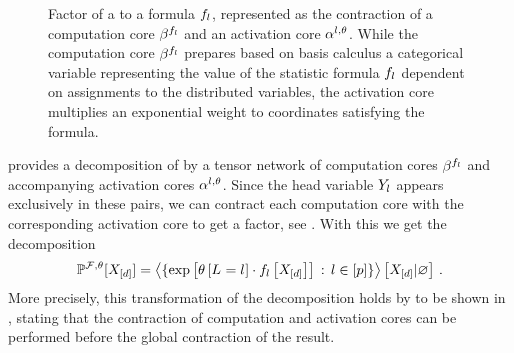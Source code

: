 \begin{figure}[t!]
    \begin{center}
        
    \end{center}
    \caption{Factor of a \MarkovLogicNetwork{} to a formula $f_{l}$, represented as the contraction of a computation core $\beta^{f_{l}}$ and an activation core $\alpha^{l,\theta}$.
    While the computation core $\beta^{f_{l}}$ prepares based on basis calculus a categorical variable representing the value of the statistic formula $f_{l}$ dependent on assignments to the distributed variables, the activation core multiplies an exponential weight to coordinates satisfying the formula.
    }
    \label{fig:mlnFactor}
\end{figure}

 provides a decomposition of \MarkovLogicNetworks{} by a tensor network of computation cores $\beta^{f_{l}}$ and accompanying activation cores $\alpha^{l,\theta}$.
Since the head variable $Y_{l}$ appears exclusively in these pairs, we can contract each computation core with the corresponding activation core to get a factor, see .
With this we get the decomposition
\begin{align*}
    \mathbb{P}^{\mathcal{F},\theta}[X_{[d]}]
    = \left\langle \{\mathrm{exp}\left[\theta\left[L_{}=l_{}\right]\cdot f_{l}\left[X_{[d]}\right]\right] \,:\, l\in[p]\}\right\rangle \left[ X_{[d]} | \varnothing \right] \, .
\end{align*}
More precisely, this transformation of the decomposition holds by  to be shown in , stating that the contraction of computation and activation cores can be performed before the global contraction of the result.

